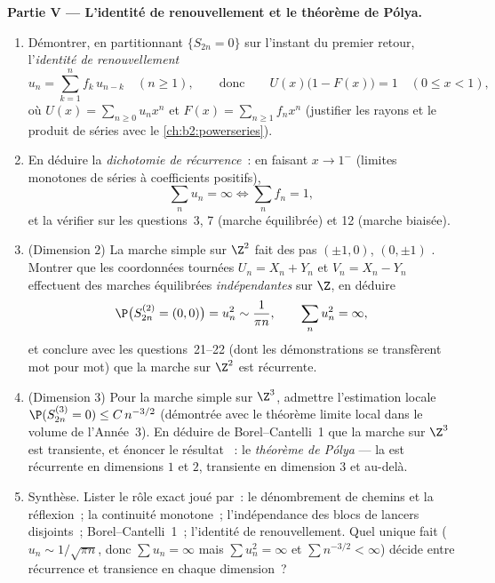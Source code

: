 \begin{problem}
\medskip
\noindent\textbf{Partie V --- L'identité de renouvellement et le
théorème de Pólya.}
\begin{enumerate}[resume]
  \item Démontrer, en partitionnant $\{S_{2n} = 0\}$ sur l'instant
        du premier retour, l'\emph{identité de renouvellement}
        \[
        u_n = \sum_{k=1}^n f_k\,u_{n-k} \quad (n \geq 1),
        \qquad\text{donc}\qquad
        U(x)\bigl(1 - F(x)\bigr) = 1 \quad (0 \leq x < 1),
        \]
        où $U(x) = \sum_{n\geq0}u_nx^n$ et $F(x) =
        \sum_{n\geq1}f_nx^n$ (justifier les rayons et le
        produit de séries avec le \cref{ch:b2:powerseries}).
  \item En déduire la \emph{dichotomie de récurrence}~: en faisant $x
        \to 1^-$ (limites monotones de séries à coefficients
        positifs),
        \[
        \sum_n u_n = \infty \iff \sum_n f_n = 1 ,
        \]
        et la vérifier sur les questions~3, 7 (marche équilibrée) et
        12 (marche biaisée).
  \item (Dimension $2$) La marche simple sur $\Z^2$ fait des pas
        $(\pm1, 0)$, $(0, \pm1)$ . Montrer que les
        coordonnées tournées $U_n = X_n + Y_n$ et $V_n = X_n
        - Y_n$ effectuent des marches équilibrées \emph{indépendantes} sur
        $\Z$, en déduire
        \[
        \P\bigl(S^{(2)}_{2n} = (0,0)\bigr) = u_n^2 \sim
        \frac1{\pi n},
        \qquad \sum_n u_n^2 = \infty ,
        \]
        et conclure avec les questions~21--22 (dont les démonstrations
        se transfèrent mot pour mot) que la marche sur $\Z^2$ est
        récurrente.
  \item (Dimension $3$) Pour la marche simple sur $\Z^3$, admettre
        l'estimation locale $\P(S^{(3)}_{2n} = 0) \leq
        C\,n^{-3/2}$ (démontrée avec le théorème limite local dans
        le volume de l'Année~3). En déduire de Borel--Cantelli~1
        que la marche sur $\Z^3$ est transiente, et énoncer le
        résultat ~: le \emph{théorème de Pólya} --- la  est récurrente en dimensions $1$ et $2$,
        transiente en dimension $3$ et au-delà.
  \item Synthèse. Lister le rôle exact joué par~: le
        dénombrement de chemins et la réflexion~; la continuité monotone~;
        l'indépendance des blocs de lancers disjoints~;
        Borel--Cantelli~1~; l'identité de renouvellement. Quel unique
        fait  ($u_n \sim 1/\sqrt{\pi n}$, donc
        $\sum u_n = \infty$ mais $\sum u_n^2 = \infty$ et
        $\sum n^{-3/2} < \infty$) décide entre récurrence
        et transience en chaque dimension~?
\end{enumerate}
\end{problem}
